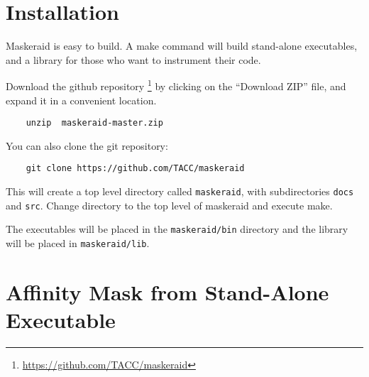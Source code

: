 \documentclass[10pt,a4paper]{report}
\begin{document}
\tableofcontents

\chapter{Installation}
Maskeraid is easy to build. A make command will build stand-alone executables, and a library for those who want to instrument their code.

Download the github repository \footnote{\href{https://github.com/TACC/maskeraid}{https://github.com/TACC/maskeraid}} by clicking on the ``Download ZIP'' file, and expand it in a convenient location.

\begin{verbatim}
    unzip  maskeraid-master.zip
\end{verbatim}

You can also clone the git repository:

\begin{verbatim}
    git clone https://github.com/TACC/maskeraid
\end{verbatim}

This will create a top level directory called \verb+maskeraid+, with subdirectories \verb+docs+ and \verb+src+. Change directory to the top level of maskeraid and execute make.





The executables will be placed in the \verb+maskeraid/bin+ directory and the library will be placed in \verb+maskeraid/lib+.

\FloatBarrier
\chapter{Affinity Mask from Stand-Alone Executable}
\end{document}
